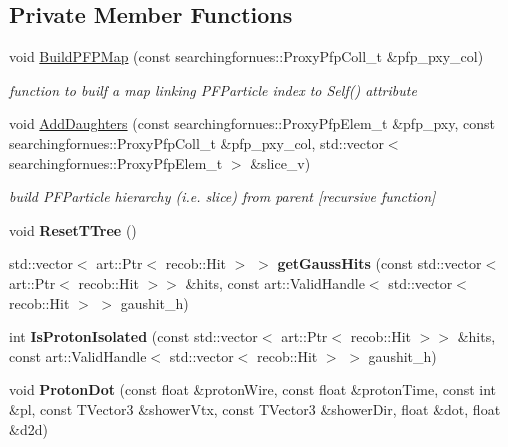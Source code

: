 \subsection*{Private Member Functions}
\begin{DoxyCompactItemize}
\item 
void \hyperlink{classProtonHitPurity_adfed832259669bb323f5a6a4eae7107e}{Build\+P\+F\+P\+Map} (const searchingfornues\+::\+Proxy\+Pfp\+Coll\+\_\+t \&pfp\+\_\+pxy\+\_\+col)
\begin{DoxyCompactList}\small\item\em function to builf a map linking P\+F\+Particle index to Self() attribute \end{DoxyCompactList}\item 
void \hyperlink{classProtonHitPurity_a7e468a256d51c80933e9bb9b6be77b94}{Add\+Daughters} (const searchingfornues\+::\+Proxy\+Pfp\+Elem\+\_\+t \&pfp\+\_\+pxy, const searchingfornues\+::\+Proxy\+Pfp\+Coll\+\_\+t \&pfp\+\_\+pxy\+\_\+col, std\+::vector$<$ searchingfornues\+::\+Proxy\+Pfp\+Elem\+\_\+t $>$ \&slice\+\_\+v)
\begin{DoxyCompactList}\small\item\em build P\+F\+Particle hierarchy (i.\+e. slice) from parent \mbox{[}recursive function\mbox{]} \end{DoxyCompactList}\item 
void {\bfseries Reset\+T\+Tree} ()\hypertarget{classProtonHitPurity_a516f5e25d7f5889fb24fb81fc3ed4697}{}\label{classProtonHitPurity_a516f5e25d7f5889fb24fb81fc3ed4697}

\item 
std\+::vector$<$ art\+::\+Ptr$<$ recob\+::\+Hit $>$ $>$ {\bfseries get\+Gauss\+Hits} (const std\+::vector$<$ art\+::\+Ptr$<$ recob\+::\+Hit $>$$>$ \&hits, const art\+::\+Valid\+Handle$<$ std\+::vector$<$ recob\+::\+Hit $>$ $>$ gaushit\+\_\+h)\hypertarget{classProtonHitPurity_af073c27c1dd243faec1019466e52dfdd}{}\label{classProtonHitPurity_af073c27c1dd243faec1019466e52dfdd}

\item 
int {\bfseries Is\+Proton\+Isolated} (const std\+::vector$<$ art\+::\+Ptr$<$ recob\+::\+Hit $>$$>$ \&hits, const art\+::\+Valid\+Handle$<$ std\+::vector$<$ recob\+::\+Hit $>$ $>$ gaushit\+\_\+h)\hypertarget{classProtonHitPurity_a7e9943415393cbdd5fbea2362e3a76e2}{}\label{classProtonHitPurity_a7e9943415393cbdd5fbea2362e3a76e2}

\item 
void {\bfseries Proton\+Dot} (const float \&proton\+Wire, const float \&proton\+Time, const int \&pl, const T\+Vector3 \&shower\+Vtx, const T\+Vector3 \&shower\+Dir, float \&dot, float \&d2d)\hypertarget{classProtonHitPurity_a4b71c7c7e85e49f74bc98960166d1fcc}{}\label{classProtonHitPurity_a4b71c7c7e85e49f74bc98960166d1fcc}


\end{DoxyCompactItemize}
